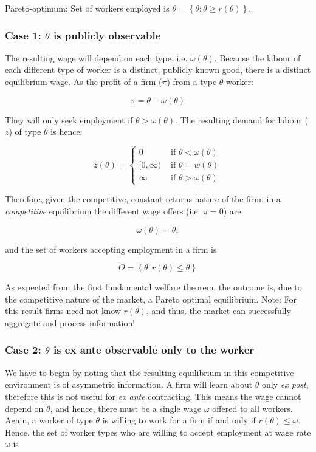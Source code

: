 \documentclass[11pt]{article}
\begin{document}
Pareto-optimum: Set of workers employed is $\theta = \left\{ \theta \colon \theta \geq r(\theta) \right\}$.

\subsubsection{Case 1: $\theta$ is publicly observable}

The resulting wage will depend on each type, i.e. $\omega(\theta)$. Because the labour of each different type of worker is a distinct, publicly known good, there is a distinct equilibrium wage. As the profit of a firm ($\pi$) from a type $\theta$ worker:

	$$ \pi = \theta - \omega(\theta) $$

They will only seek employment if $\theta > \omega(\theta)$. The resulting demand for labour ($z$) of type $\theta$ is hence:

	$$ z(\theta) = \begin{cases} 0 & \text{ if } \theta < \omega(\theta) \\ [0, \infty) & \text{ if } \theta = w(\theta) \\ \infty & \text{ if } \theta > \omega(\theta) \end{cases} $$

Therefore, given the competitive, constant returns nature of the firm, in a \textit{competitive} equilibrium the different wage offers (i.e. $\pi = 0$) are
 
	$$ \omega(\theta) = \theta, $$
	
and the set of workers accepting employment in a firm is

	$$ \Theta = \left\{ \theta \colon r(\theta) \leq \theta \right\} $$
	
As expected from the first fundamental welfare theorem, the outcome is, due to the competitive nature of the market, a Pareto optimal equilibrium. Note: For this result firms need not know $r(\theta)$, and thus, the market can successfully aggregate and process information!

\subsubsection{Case 2: $\theta$ is ex ante observable only to the worker}

We have to begin by noting that the resulting equilibrium in this competitive environment is of asymmetric information. A firm will learn about $\theta$ only \textit{ex post}, therefore  this is not useful for \textit{ex ante} contracting. This means the wage cannot depend on $\theta$, and hence, there must be a single wage $\omega$ offered to all workers. Again, a worker of type $\theta$ is willing to work for a firm if and only if $r(\theta) \leq \omega$. Hence, the set of worker types who are willing to accept employment at wage rate $\omega$ is
\end{document}

